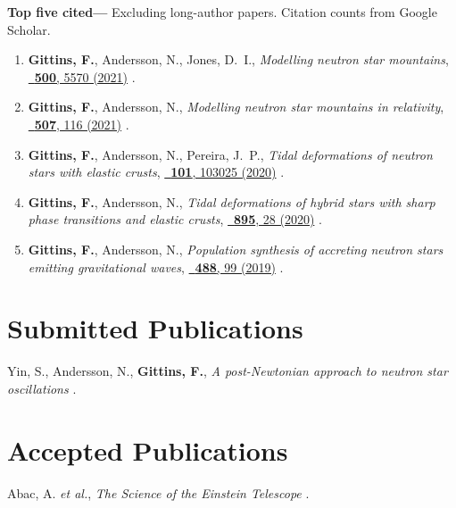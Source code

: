\textbf{Top five cited---}%
Excluding long-author papers.
Citation counts from Google Scholar.
\begin{enumerate}
\item
  \textbf{Gittins, F.}, Andersson, N., Jones, D.~I.,
  \textit{Modelling neutron star mountains},
  \href{https://doi.org/10.1093/mnras/staa3635}%
  {\mnras\ \textbf{500}, 5570 (2021)}
  .
\item
  \textbf{Gittins, F.}, Andersson, N.,
  \textit{Modelling neutron star mountains in relativity},
  \href{https://doi.org/10.1093/mnras/stab2048}%
  {\mnras\ \textbf{507}, 116 (2021)}
  .
\item
  \textbf{Gittins, F.}, Andersson, N., Pereira, J.~P.,
  \textit{Tidal deformations of neutron stars with elastic crusts},
  \href{https://doi.org/10.1103/PhysRevD.101.103025}%
  {\prd\ \textbf{101}, 103025 (2020)}
  .
\item
  \textbf{Gittins, F.}, Andersson, N.,
  \textit{Tidal deformations of hybrid stars with sharp phase transitions and
  elastic crusts},
  \href{https://doi.org/10.3847/1538-4357/ab8aca}%
  {\apj\ \textbf{895}, 28 (2020)}
  .
\item
  \textbf{Gittins, F.}, Andersson, N.,
  \textit{Population synthesis of accreting neutron stars emitting
  gravitational waves},
  \href{https://doi.org/10.1093/mnras/stz1719}%
  {\mnras\ \textbf{488}, 99 (2019)}
  .
\end{enumerate}
\else%
\fi

\renewcommand{\citeCount}[1]{}

\section{Submitted Publications}
\secstartswithlist{}%
\begin{etaremune}[start=\value{pubCounter}]
\item
  Yin, S., Andersson, N., \textbf{Gittins, F.},
  \textit{A post-Newtonian approach to neutron star oscillations}
  .
  \citeCount{2}
%
  \setcounter{pubCounter}{\value{enumi}}
\end{etaremune}

\section{Accepted Publications}
\secstartswithlist{}%
\addtocounter{pubCounter}{-1}%
\begin{etaremune}[start=\value{pubCounter}]
\item
  Abac, A. \textit{et al.},
  \textit{The Science of the Einstein Telescope}
  .
  \citeCount{36}
%
  \setcounter{pubCounter}{\value{enumi}}
\end{etaremune}

